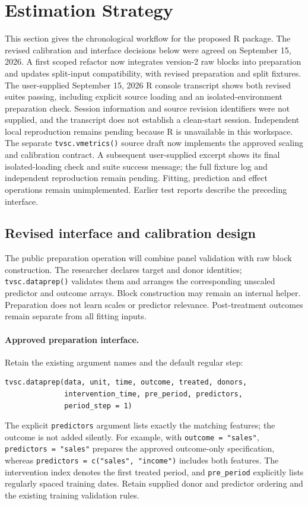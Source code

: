 \documentclass[11pt]{article}
\begin{document}
\section{Estimation Strategy}\label{sec:estimation}
This section gives the chronological workflow for the proposed R package.
The revised calibration and interface decisions below were agreed on
September 15, 2026. A first scoped refactor now integrates version-2 raw
blocks into preparation and updates split-input compatibility, with revised
preparation and split fixtures. The user-supplied September 15, 2026 R
console transcript shows both revised suites passing, including explicit
source loading and an isolated-environment preparation check. Session
information and source revision identifiers were not supplied, and the
transcript does not establish a clean-start session. Independent local
reproduction remains pending because R is unavailable in this workspace.
The separate \texttt{tvsc.vmetrics()} source draft now implements the
approved scaling and calibration contract. A subsequent user-supplied
excerpt shows its final isolated-loading check and suite success message;
the full fixture log and independent reproduction remain pending.
Fitting, prediction and effect operations remain unimplemented.
Earlier test reports describe the preceding interface.

\subsection{Revised interface and calibration design}\label{sec:revised-design}
The public preparation operation will combine panel validation with raw
block construction. The researcher declares target and donor identities;
\texttt{tvsc.dataprep()} validates them and arranges the corresponding
unscaled predictor and outcome arrays. Block construction may remain an
internal helper. Preparation does not learn scales or predictor relevance.
Post-treatment outcomes remain separate from all fitting inputs.

\paragraph{Approved preparation interface.}
Retain the existing argument names and the default regular step:
\begin{verbatim}
tvsc.dataprep(data, unit, time, outcome, treated, donors,
              intervention_time, pre_period, predictors,
              period_step = 1)
\end{verbatim}
The explicit \texttt{predictors} argument lists exactly the matching
features; the outcome is not added silently. For example, with
\texttt{outcome = "sales"}, \texttt{predictors = "sales"} prepares the
approved outcome-only specification, whereas
\texttt{predictors = c("sales", "income")} includes both features.
The intervention index denotes the first treated period, and
\texttt{pre\_period} explicitly lists regularly spaced training dates.
Retain supplied donor and predictor ordering and the existing training
validation rules.
\end{document}
